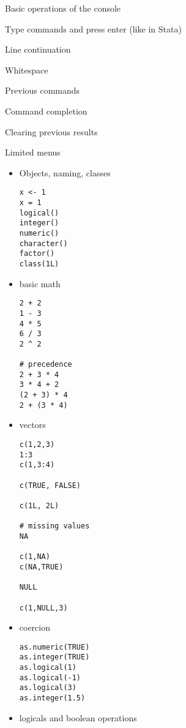\documentclass[a4paper,12pt]{article}
\begin{document}
Basic operations of the console
\begin{itemize*}
\item Type commands and press enter (like in Stata)
\item Line continuation
\item Whitespace
\item Previous commands
\item Command completion
\item Clearing previous results
\item Limited menus
\end{itemize*}



\begin{itemize}

\item Objects, naming, classes

\begin{lstlisting}
x <- 1
x = 1
logical()
integer()
numeric()
character()
factor()
class(1L)
\end{lstlisting}

\item basic math

\begin{lstlisting}
2 + 2
1 - 3
4 * 5
6 / 3
2 ^ 2

# precedence
2 + 3 * 4
3 * 4 + 2
(2 + 3) * 4
2 + (3 * 4)
\end{lstlisting}



\item vectors

\begin{lstlisting}
c(1,2,3)
1:3
c(1,3:4)

c(TRUE, FALSE)

c(1L, 2L)

# missing values
NA

c(1,NA)
c(NA,TRUE)

NULL

c(1,NULL,3)
\end{lstlisting}

\item coercion

\begin{lstlisting}
as.numeric(TRUE)
as.integer(TRUE)
as.logical(1)
as.logical(-1)
as.logical(3)
as.integer(1.5)
\end{lstlisting}

\item logicals and boolean operations


\end{itemize}
\end{document}

